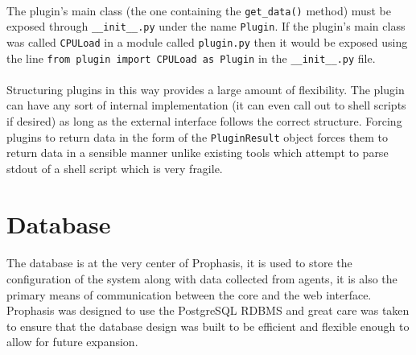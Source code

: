 \documentclass[bsc,logo,twoside,singlespacing,notimes]{infthesis}
\begin{document}
\paragraph*{}
	The plugin's main class (the one containing the \texttt{get\_data()} method)
	must be exposed through \texttt{\_\_init\_\_.py} under the name \texttt{Plugin}.
	If the plugin's main class was called \texttt{CPULoad} in a module called
	\texttt{plugin.py} then it would be exposed using the line
	\texttt{from plugin import CPULoad as Plugin} in the \texttt{\_\_init\_\_.py}
	file.
	
\paragraph*{}
	Structuring plugins in this way provides a large amount of flexibility.  The
	plugin can have any sort of internal implementation (it can even call out to
	shell scripts if desired) as long as the external interface follows the correct
	structure.  Forcing plugins to return data in the form of the
	\texttt{PluginResult} object forces them to return data in a sensible manner
	unlike existing tools which attempt to parse stdout of a shell script which is
	very fragile. 
	
\section{Database}
\paragraph*{}
	The database is at the very center of Prophasis, it is used to store the
	configuration of the system along with data collected from agents, it is also
	the primary means of communication between the core and the web interface.
	Prophasis was designed to use the PostgreSQL RDBMS and great care was taken to
	ensure that the database design was built to be efficient and flexible enough
	to allow for future expansion.
	
\end{document}
